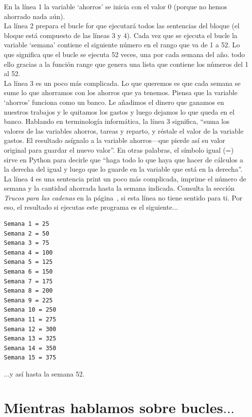En la línea 1 la variable `ahorros' se inicia con el valor 0 (porque no hemos ahorrado nada aún).\\
La línea 2 prepara el bucle for que ejecutará todos las sentencias del bloque (el bloque está compuesto de las líneas 3 y 4).  Cada vez que se ejecuta el bucle la variable `semana' contiene el siguiente número en el rango que va de 1 a 52. Lo que significa que el bucle se ejecuta 52 veces, una por cada semana del año. todo ello gracias a la función range que genera una lista que contiene los números del 1 al 52.\\
La línea 3 es un poco más complicada.  Lo que queremos es que cada semana se sume lo que ahorramos con los ahorros que ya tenemos.   Piensa que la variable `ahorros' funciona como un banco.  Le añadimos el dinero que ganamos en nuestros trabajos y le quitamos los gastos y luego dejamos lo que queda en el banco.  Hablando en terminología informática, la línea 3 significa, ``suma los valores de las variables ahorros, tareas y  reparto, y réstale el valor de la variable gastos. El resultado asígnalo a la variable ahorros---que pierde así su valor original para guardar el nuevo valor''. En otras palabras, el símbolo igual (=) sirve en Python para decirle que ``haga todo lo que haya que hacer de cálculos a la derecha del igual y luego que lo guarde en la variable que está en la derecha''.\\ 
La línea 4 es una sentencia print un poco más complicada, imprime el número de semana y la cantidad ahorrada hasta la semana indicada.  Consulta la sección \emph{Trucos para las cadenas} en la página~\pageref{trickswithstrings}, si esta línea no tiene sentido para ti.  Por eso, el resultado si ejecutas este programa es el siguiente$\ldots$

\begin{listing}
\begin{verbatim}
Semana 1 = 25
Semana 2 = 50
Semana 3 = 75
Semana 4 = 100
Semana 5 = 125
Semana 6 = 150
Semana 7 = 175
Semana 8 = 200
Semana 9 = 225
Semana 10 = 250
Semana 11 = 275
Semana 12 = 300
Semana 13 = 325
Semana 14 = 350
Semana 15 = 375
\end{verbatim}
\end{listing}

$\ldots$y así hasta la semana 52.

\section{Mientras hablamos sobre bucles$\ldots$}

